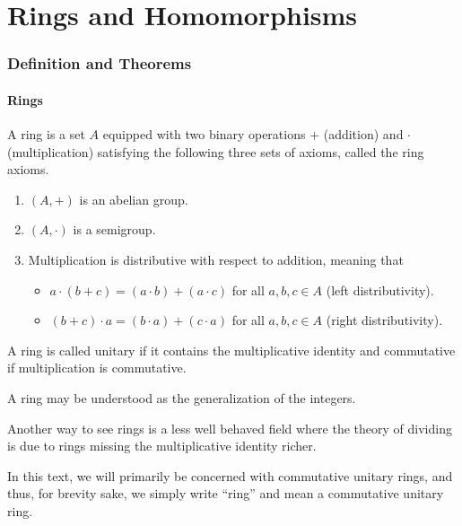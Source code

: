\chapter{Rings and Homomorphisms}
\subsection*{Definition and Theorems}
\subsubsection*{Rings}
\begin{defbox}
    \begin{definition}[Ring]
        A ring is a set \(A\) equipped with two binary operations \(+\) (addition) and \(\cdot\) (multiplication) satisfying the following three sets of axioms, called the ring axioms.
    \begin{enumerate}
      \item \((A, +)\) is an abelian group.
      \item \((A, \cdot)\) is a semigroup.
      \item Multiplication is distributive with respect to addition, meaning that
      \begin{itemize}
        \item \(a \cdot (b + c) = (a \cdot b) + (a \cdot c)\) for all \(a, b, c \in A\) (left distributivity).
        \item \((b + c) \cdot a = (b \cdot a) + (c \cdot a)\) for all \(a, b, c \in A\) (right distributivity).
      \end{itemize}
    \end{enumerate}
    A ring is called unitary if it contains the multiplicative identity and commutative if multiplication is commutative.
    \end{definition}
\end{defbox}
%
%
%
\begin{intbox}
    \begin{intuition}
        A ring may be understood as the generalization of the integers.

        Another way to see rings is a less well behaved field where the theory of dividing is due to rings missing the multiplicative identity richer.
    \end{intuition}
\end{intbox}
%
%
%
\begin{rembox}
    \begin{remark}
        In this text, we will primarily be concerned with commutative unitary rings, and thus, for brevity sake, we simply write ``ring'' and mean a commutative unitary ring.
    \end{remark}
\end{rembox}
